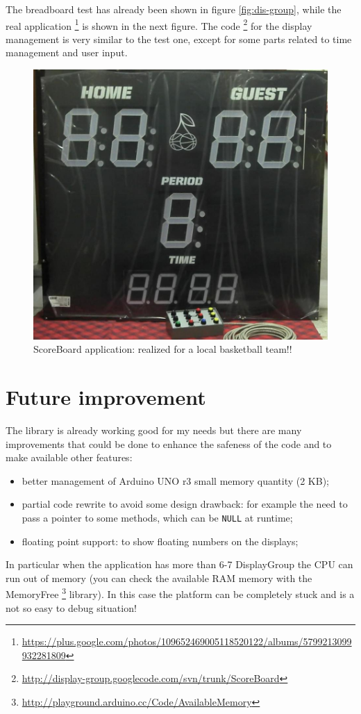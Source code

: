 \documentclass[11pt,english]{article}
\newcommand{\code}[1]{\texttt{#1}}
\begin{document}
The breadboard test has already been shown in figure \ref{fig:dis-group}, while the real application 
\footnote{\url{https://plus.google.com/photos/109652469005118520122/albums/5799213099932281809}} is shown 
in the next figure. 
The code \footnote{\url{http://display-group.googlecode.com/svn/trunk/ScoreBoard}} for the display 
management is very similar to the test one, except for some parts related to time management and user input.
%
\begin{figure}[H]
\centering\includegraphics[scale=0.55]{img/ScoreBoard}

\caption{ScoreBoard application: realized for a local basketball team!!\label{fig:scoreboard}}

\end{figure}


\section{Future improvement}\label{sec:future}

The library is already working good for my needs but there are many improvements that could be done to
enhance the safeness of the code and to make available other features:

\begin{itemize}
 \item better management of Arduino UNO r3 small memory quantity (2 KB);
 \item partial code rewrite to avoid some design drawback: for example the need to pass a pointer to some 
       methods, which can be \code{NULL} at runtime;
 \item floating point support: to show floating numbers on the displays;
\end{itemize}

In particular when the application has more than 6-7 DisplayGroup the CPU can run out of memory (you can 
check the available RAM memory with the MemoryFree \footnote{\url{http://playground.arduino.cc/Code/AvailableMemory}} 
library). In this case the platform can be completely stuck and is a not so easy to debug situation!
\end{document}
